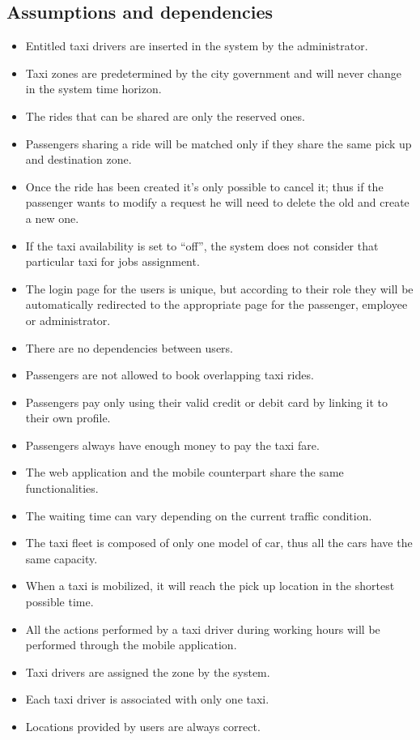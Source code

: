 \documentclass[a4paper,11pt]{report} %
\begin{document}
	\subsection{Assumptions and dependencies}
		\begin{itemize}
			\item Entitled taxi drivers are inserted in the system by the administrator.
			\item Taxi zones are predetermined by the city government and will never change in the system time horizon.
			\item The rides that can be shared are only the reserved ones.
			\item Passengers sharing a ride will be matched only if they share the same pick up and destination zone.
			\item Once the ride has been created it's only possible to cancel it; thus if the passenger wants to modify a request he will need to delete the old and create a new one.
			
			
			
			\item If the taxi availability is set to ``off'', the system does not consider that particular taxi for jobs assignment.
			\item The login page for the users is unique, but according to their role they will be automatically redirected to the appropriate page for the passenger, employee or administrator.
			\item There are no dependencies between users.
			\item Passengers are not allowed to book overlapping taxi rides.
			\item Passengers pay only using their valid credit or debit card by linking it to their own profile.
			\item Passengers always have enough money to pay the taxi fare.
			\item The web application and the mobile counterpart share the same functionalities.
			\item The waiting time can vary depending on the current traffic condition.
			\item The taxi fleet is composed of only one model of car, thus all the cars have the same capacity.
			\item When a taxi is mobilized, it will reach the pick up location in the shortest possible time.
			\item All the actions performed by a taxi driver during working hours will be performed through the mobile application.
			\item Taxi drivers are assigned the zone by the system.
			\item Each taxi driver is associated with only one taxi.
			\item Locations provided by users are always correct.
		\end{itemize}
	
\end{document}
